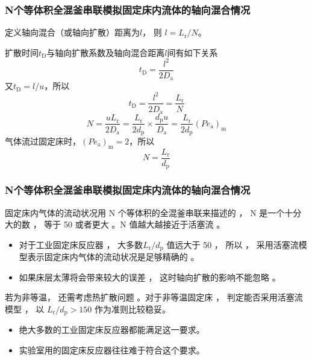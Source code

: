 \documentclass[dvipsnames, svgnames, x11names]{beamer}
\begin{document}
\begin{frame}
    \frametitle{N个等体积全混釜串联模拟固定床内流体的轴向混合情况}
    定义轴向混合（或轴向扩散）距离为$l$， 则 $l=L_\mathrm{r}/N$。
    
    扩散时间$t_\mathrm{D}$与轴向扩散系数及轴向混合距离$l$间有如下关系
    \[
        t_\mathrm{D} = \frac{l^2}{2D_\mathrm{a}}
    \]
    又$t_\mathrm{D} = l/u$，所以
    \[
        t_\mathrm{D} = \frac{l^2}{2D_\mathrm{a}} = \frac{L_\mathrm{r}}{N}
    \]
    \[
        N = \frac{uL_\mathrm{r}}{2D_\mathrm{a}} = \frac{L_\mathrm{r}}{2d_\mathrm{p}}\times \frac{d_\mathrm{p}u}{D_\mathrm{a}} = \frac{L_\mathrm{r}}{2d_\mathrm{p}}(P e_\mathrm{a})_\mathrm{m}
    \]
    气体流过固定床时，$(P e_\mathrm{a})_\mathrm{m}=2$，所以
    \[
        N = \frac{L_\mathrm{r}}{d_\mathrm{p}}
    \]
\end{frame}


\begin{frame}
    \frametitle{N个等体积全混釜串联模拟固定床内流体的轴向混合情况}
    固定床内气体的流动状况用 N 个等体积的全混釜串联来描述的 ， N 是一个十分大的数 ， 等于 50 或者更大 。N 值越大越接近于活塞流 。
    \begin{itemize}
      \item 对于工业固定床反应器 ， 大多数$L_\mathrm{r}/d_\mathrm{p}$ 值远大于 50 ， 所以 ， 采用活塞流模型表示固定床内气体的流动状况是足够精确的 。
      \item 如果床层太薄将会带来较大的误差 ， 这时轴向扩散的影响不能忽略 。
    \end{itemize}
    若为非等温， 还需考虑热扩散问题 。对于非等温固定床 ， 判定能否采用活塞流模型 ， 以 ${L_\mathrm{r}}/{d_\mathrm{p}}> 150$ 作为准则比较稳妥。
    \begin{itemize}
      \item 绝大多数的工业固定床反应器都能满足这一要求。
      \item 实验室用的固定床反应器往往难于符合这个要求。
    \end{itemize}
\end{frame}
\end{document}
